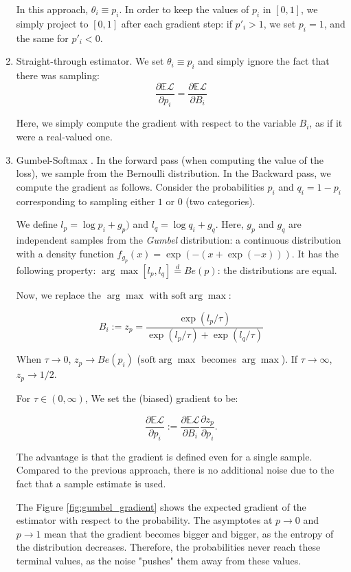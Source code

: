 \documentclass[a4paper,11pt,oneside]{report}
\begin{document}
\begin{enumerate}
    In this approach, $\theta_i\equiv p_i$. In order to keep the values of $p_i$ in $[0,1]$, we simply project to $[0,1]$ after each gradient step: if $p'_i>1$, we set $p_i=1$, and the same for $p'_i<0$.

    \item Straight-through estimator. We set $\theta_i\equiv p_i$ and simply ignore the fact that there was sampling:
    $$
    \frac{\partial \mathbb E \mathcal L}{\partial p_i}=\frac{\partial \mathbb E \mathcal L}{\partial B_i}
    $$

    Here, we simply compute the gradient with respect to the variable $B_i$, as if it were a real-valued one.
    \item Gumbel-Softmax \cite{Jang}. In the forward pass (when computing the value of the loss), we sample from the Bernoulli distribution. In the Backward pass, we compute the gradient as follows. Consider the probabilities $p_i$ and $q_i=1-p_i$ corresponding to sampling either $1$ or $0$ (two categories).

    We define $l_p=\log p_i+g_p)$ and $l_q=\log q_i+g_q$. Here, $g_p$ and $g_q$ are independent samples from the {\em Gumbel} distribution: a continuous distribution with a density function $f_{g_p}(x)=\exp(-(x+\exp(-x)))$. It has the following property: $\arg\max [l_p, l_q]\overset{d}{=}Be(p)$: the distributions are equal.

    Now, we replace the $\arg\max$ with $\mbox{soft}\arg\max$:

    $$
    B_i:=z_p=\frac{\exp(l_p/\tau)}{\exp(l_p/\tau)+\exp(l_q/\tau)}
    $$

    When $\tau\to 0$, $z_p\to Be(p_i)$ ($\mbox{soft}\arg\max$ becomes $\arg\max$). If $\tau\to\infty$, $z_p\to1/2$.

    For $\tau\in(0,\infty)$, We set the (biased) gradient to be:

    $$
    \frac{\partial \mathbb E\mathcal L}{\partial p_i}:=\frac{\partial \mathbb E \mathcal L}{\partial B_i}\frac{\partial z_p}{\partial p_i}.
    $$

    The advantage is that the gradient is defined even for a single sample. Compared to the previous approach, there is no additional noise due to the fact that a sample estimate is used.

    The Figure \ref{fig:gumbel_gradient} shows the expected gradient of the estimator \cite{andriyash2018improved} with respect to the probability.
    The asymptotes at $p\to 0$ and $p\to 1$ mean that the gradient becomes bigger and bigger, as the entropy of the distribution decreases. Therefore, the probabilities never reach these terminal values, as the noise "pushes" them away from these values.


\end{enumerate}
\end{document}
